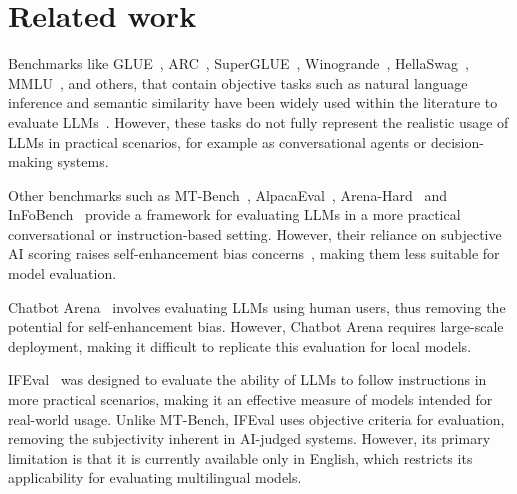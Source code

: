 \section{Related work}

Benchmarks like GLUE~\cite{wang-etal-2018-glue}, ARC~\cite{allenai:arc}, SuperGLUE~\cite{wang2019superglue}, Winogrande~\cite{sakaguchi2019winogrande}, HellaSwag~\cite{zellers2019hellaswag}, MMLU~\cite{hendryckstest2021}, and others, that contain objective tasks such as natural language inference and semantic similarity have been widely used within the literature to evaluate LLMs~\cite{anil2023palm,le2023bloom,dettmers2023qlora}. However, these tasks do not fully represent the realistic usage of LLMs in practical scenarios, for example as conversational agents or decision-making systems.

Other benchmarks such as MT-Bench~\cite{zheng2023judging}, AlpacaEval~\cite{dubois2024length}, Arena-Hard~\cite{li2024crowdsourced} and InFoBench~\cite{qin-etal-2024-infobench} provide a framework for evaluating LLMs in a more practical conversational or instruction-based setting. However, their reliance on subjective AI scoring raises self-enhancement bias concerns~\cite{xu-etal-2024-pride}, making them less suitable for model evaluation.

Chatbot Arena~\cite{zheng2023judging} involves evaluating LLMs using human users, thus removing the potential for self-enhancement bias. However, Chatbot Arena requires large-scale deployment, making it difficult to replicate this evaluation for local models.

IFEval~\cite{zhou2023instruction} was designed to evaluate the ability of LLMs to follow instructions in more practical scenarios, making it an effective measure of models intended for real-world usage. Unlike MT-Bench, IFEval uses objective criteria for evaluation, removing the subjectivity inherent in AI-judged systems. However, its primary limitation is that it is currently available only in English, which restricts its applicability for evaluating multilingual models.


